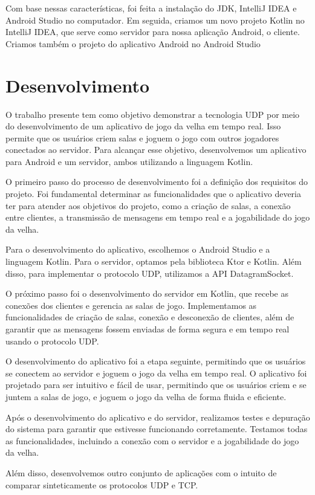 \documentclass[12pt]{article}
\begin{document}
Com base nessas características, foi feita a instalação do JDK, IntelliJ IDEA e Android Studio no computador. Em seguida, criamos um novo projeto Kotlin no IntelliJ IDEA, que serve como servidor para nossa aplicação Android, o cliente. Criamos também o projeto do aplicativo Android no Android Studio

\section{Desenvolvimento}
O trabalho presente tem como objetivo demonstrar a tecnologia UDP por meio do desenvolvimento de um aplicativo de jogo da velha em tempo real. Isso permite que os usuários criem salas e joguem o jogo com outros jogadores conectados ao servidor. Para alcançar esse objetivo, desenvolvemos um aplicativo para Android e um servidor, ambos utilizando a linguagem Kotlin.

O primeiro passo do processo de desenvolvimento foi a definição dos requisitos do projeto. Foi fundamental determinar as funcionalidades que o aplicativo deveria ter para atender aos objetivos do projeto, como a criação de salas, a conexão entre clientes, a transmissão de mensagens em tempo real e a jogabilidade do jogo da velha.

Para o desenvolvimento do aplicativo, escolhemos o Android Studio e a linguagem Kotlin. Para o servidor, optamos pela biblioteca Ktor e Kotlin. Além disso, para implementar o protocolo UDP, utilizamos a API DatagramSocket.

O próximo passo foi o desenvolvimento do servidor em Kotlin, que recebe as conexões dos clientes e gerencia as salas de jogo. Implementamos as funcionalidades de criação de salas, conexão e desconexão de clientes, além de garantir que as mensagens fossem enviadas de forma segura e em tempo real usando o protocolo UDP.

O desenvolvimento do aplicativo foi a etapa seguinte, permitindo que os usuários se conectem ao servidor e joguem o jogo da velha em tempo real. O aplicativo foi projetado para ser intuitivo e fácil de usar, permitindo que os usuários criem e se juntem a salas de jogo, e joguem o jogo da velha de forma fluida e eficiente.

Após o desenvolvimento do aplicativo e do servidor, realizamos testes e depuração do sistema para garantir que estivesse funcionando corretamente. Testamos todas as funcionalidades, incluindo a conexão com o servidor e a jogabilidade do jogo da velha.

Além disso, desenvolvemos outro conjunto de aplicações com o intuito de comparar sinteticamente os protocolos UDP e TCP.
\end{document}
